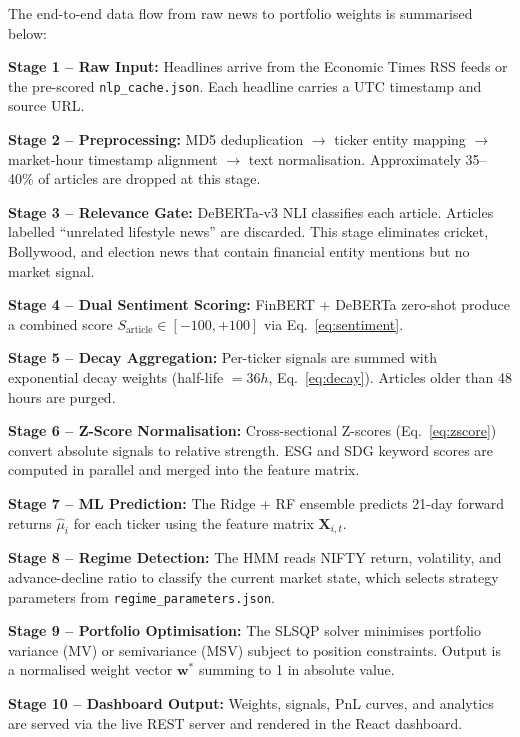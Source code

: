 \documentclass[12pt, a4paper]{article}
\begin{document}
The end-to-end data flow from raw news to portfolio weights is summarised below:

\vspace{0.5em}
\noindent\textbf{Stage 1 -- Raw Input:} Headlines arrive from the Economic Times RSS feeds or the pre-scored \texttt{nlp\_cache.json}. Each headline carries a UTC timestamp and source URL.

\noindent\textbf{Stage 2 -- Preprocessing:} MD5 deduplication $\to$ ticker entity mapping $\to$ market-hour timestamp alignment $\to$ text normalisation. Approximately 35--40\% of articles are dropped at this stage.

\noindent\textbf{Stage 3 -- Relevance Gate:} DeBERTa-v3 NLI classifies each article. Articles labelled ``unrelated lifestyle news'' are discarded. This stage eliminates cricket, Bollywood, and election news that contain financial entity mentions but no market signal.

\noindent\textbf{Stage 4 -- Dual Sentiment Scoring:} FinBERT + DeBERTa zero-shot produce a combined score $S_{\text{article}} \in [-100, +100]$ via Eq.~\ref{eq:sentiment}.

\noindent\textbf{Stage 5 -- Decay Aggregation:} Per-ticker signals are summed with exponential decay weights (half-life $= 36h$, Eq.~\ref{eq:decay}). Articles older than 48 hours are purged.

\noindent\textbf{Stage 6 -- Z-Score Normalisation:} Cross-sectional Z-scores (Eq.~\ref{eq:zscore}) convert absolute signals to relative strength. ESG and SDG keyword scores are computed in parallel and merged into the feature matrix.

\noindent\textbf{Stage 7 -- ML Prediction:} The Ridge + RF ensemble predicts 21-day forward returns $\hat{\mu}_i$ for each ticker using the feature matrix $\mathbf{X}_{i,t}$.

\noindent\textbf{Stage 8 -- Regime Detection:} The HMM reads NIFTY return, volatility, and advance-decline ratio to classify the current market state, which selects strategy parameters from \texttt{regime\_parameters.json}.

\noindent\textbf{Stage 9 -- Portfolio Optimisation:} The SLSQP solver minimises portfolio variance (MV) or semivariance (MSV) subject to position constraints. Output is a normalised weight vector $\mathbf{w}^*$ summing to 1 in absolute value.

\noindent\textbf{Stage 10 -- Dashboard Output:} Weights, signals, PnL curves, and analytics are served via the live REST server and rendered in the React dashboard.
\end{document}
